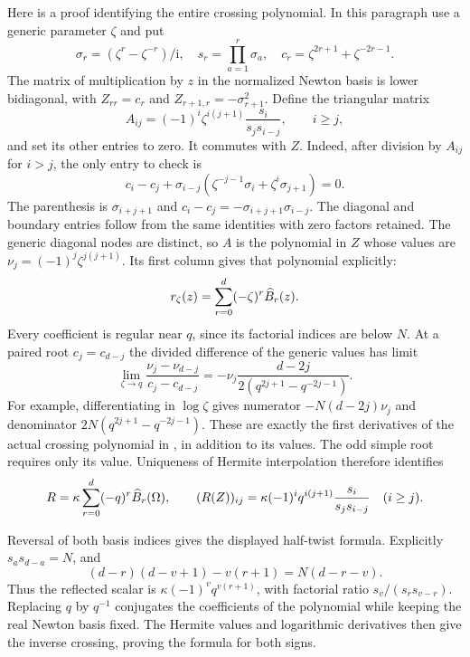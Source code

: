 \documentclass[11pt]{article}
\numberwithin{equation}{section}
\theoremstyle{definition}\newtheorem{definition}[theorem]{Definition}
\theoremstyle{remark}\newtheorem{remark}[theorem]{Remark}
\newcommand{\ii}{\mathrm i}\newcommand{\dd}{\mathrm d}
\begin{document}
Here is a proof identifying the entire crossing polynomial. In this
paragraph use a generic parameter $\zeta$ and put
\[
 \sigma_r=(\zeta^r-\zeta^{-r})/\ii,\quad
 s_r=\prod_{a=1}^r\sigma_a,\quad
 c_r=\zeta^{2r+1}+\zeta^{-2r-1}.
\]
The matrix of multiplication by $z$ in the normalized Newton basis
is lower bidiagonal, with $Z_{rr}=c_r$ and
$Z_{r+1,r}=-\sigma_{r+1}^2$. Define the triangular matrix
\[
 A_{ij}=(-1)^i\zeta^{i(j+1)}\frac{s_i}{s_js_{i-j}},
 \qquad i\ge j,
\]
and set its other entries to zero. It commutes with $Z$.
Indeed, after division by $A_{ij}$ for $i>j$, the only entry to
check is
\[
 c_i-c_j+\sigma_{i-j}
       (\zeta^{-j-1}\sigma_i+\zeta^i\sigma_{j+1})=0.
\]
The parenthesis is $\sigma_{i+j+1}$ and
$c_i-c_j=-\sigma_{i+j+1}\sigma_{i-j}$. The diagonal and boundary
entries follow from the same identities with zero factors retained.
The generic diagonal nodes are distinct, so $A$ is the polynomial
in $Z$ whose values are $\nu_j=(-1)^j\zeta^{j(j+1)}$.
Its first column gives that polynomial explicitly:
\[
 r_\zeta(z)=\sum_{r=0}^d(-\zeta)^r\widehat B_r(z).
\]
Every coefficient is regular near $q$, since its factorial indices
are below $N$. At a paired root $c_j=c_{d-j}$ the divided difference
of the generic values has limit
\[
 \lim_{\zeta\to q}
 \frac{\nu_j-\nu_{d-j}}{c_j-c_{d-j}}
 =-\nu_j\frac{d-2j}{2(q^{2j+1}-q^{-2j-1})}.
\]
For example, differentiating in $\log\zeta$ gives numerator
$-N(d-2j)\nu_j$ and denominator
$2N(q^{2j+1}-q^{-2j-1})$. These are exactly the first derivatives
of the actual crossing polynomial in \cite[Proposition 5.1]{Finite},
in addition to its values. The odd simple root requires only its
value. Uniqueness of Hermite interpolation therefore identifies
\begin{equation}\label{nt:crossing-newton}
 R=\kappa\sum_{r=0}^d(-q)^r\widehat B_r(\Omega),\qquad
 (R(Z))_{ij}=\kappa(-1)^i q^{i(j+1)}
                           \frac{s_i}{s_js_{i-j}}\quad(i\ge j).
\end{equation}

Reversal of both basis indices gives the displayed half-twist formula.
Explicitly $s_a s_{d-a}=N$, and
\[
 (d-r)(d-v+1)-v(r+1)=N(d-r-v).
\]
Thus the reflected scalar is $\kappa(-1)^v q^{v(r+1)}$, with
factorial ratio $s_v/(s_rs_{v-r})$. Replacing $q$ by $q^{-1}$
conjugates the coefficients of the polynomial while keeping the real
Newton basis fixed. The Hermite values and logarithmic derivatives
then give the inverse crossing, proving the formula for both signs.
\end{document}
